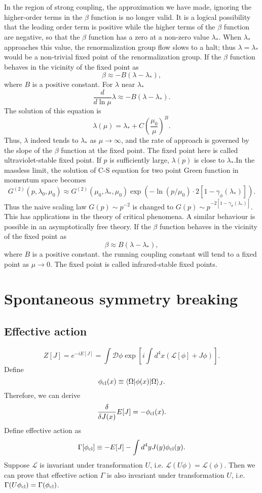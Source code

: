 \\ \\
In the region of strong coupling, the approximation we have made, ignoring the higher-order terms in the $\beta$ function is no longer valid. It is a logical possibility that the leading order term is positive while the higher terms of the $\beta$ function are negative, so that the $\beta$ function has a zero at a non-zero value $\lambda_*$. When $\lambda_*$ approaches this value, the renormalization group flow slows to a halt; thus $\lambda = \lambda_*$ would be a non-trivial fixed point of the renormalization group. 
If the $\beta$ function behaves in the vicinity of the fixed point as 
\[\beta \approx -B(\lambda - \lambda_*),\] 
where $B$ is a positive constant. For $\lambda$ near $\lambda_*$ 
\[\frac{d}{d\ln \mu} \lambda \approx -B(\lambda-\lambda_*).\]
The solution of this equation is
\[\lambda(\mu) = \lambda_* + C(\frac{\mu_0}{\mu})^B.\]
Thus, $\lambda$ indeed tends to $\lambda_*$ as $\mu \to \infty$, and the rate of approach is governed by the slope of the $\beta$ function at the fixed point. The fixed point here is called ultraviolet-stable fixed point. 
If $p$ is sufficiently large, $\lambda(p)$ is close to $\lambda_*$.In the massless limit, the solution of C-S equation for two point Green function in momentum space becomes
\[G^{(2)}(p,\lambda_0,\mu_0) \approx G^{(2)}(\mu_0,\lambda_*,\mu_0)\exp \left (- \ln(p/\mu_0) \cdot 2[1-\gamma_{\phi}(\lambda_*)] \right ).\]
Thus the naive scaling law $G(p) \sim p^{-2}$ is changed to $G(p) \sim p^{-2[1-\gamma_{\phi}(\lambda_*)]}$. This has applications in the theory of critical phenomena.
A similar behaviour is possible in an asymptotically free theory. If the $\beta$ function behaves in the vicinity of the fixed point as 
\[\beta \approx B(\lambda - \lambda_*),\] 
where $B$ is a positive constant.
the running coupling constant will tend to a fixed point as $\mu \to 0$.  The fixed point is called infrared-stable fixed points. 

\section{Spontaneous symmetry breaking}
\subsection{Effective action}
\[Z[J] = e^{-iE[J]} = \int \mathcal{D} \phi \exp\left[ i\int d^4x (\mathcal{L}[\phi] + J \phi) \right].\]
Define 
\[\phi_{\rm cl} (x) \equiv \langle \Omega | \phi(x) | \Omega \rangle_{J}.\]
Therefore, we can derive
\[\frac{\delta}{\delta J(x)} E[J] = - \phi_{\rm cl}(x).\]
Define effective action as
\[\Gamma[\phi_{\rm cl}] \equiv -E[J] - \int d^4y J(y) \phi_{\rm cl}(y).\]
Suppose $\mathcal{L}$ is invariant under transformation $U$, i.e. $\mathcal{L}(U\phi) = \mathcal{L}(\phi) $. Then we can prove that effective action $\Gamma$ is also invariant under transformation $U$, i.e. $\Gamma(U\phi_{\rm cl}) = \Gamma(\phi_{\rm cl}) $.

